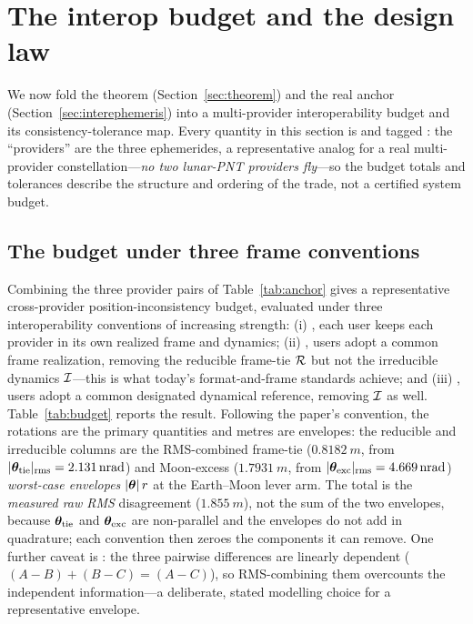 \section{The interop budget and the design law}
\label{sec:budget}

We now fold the theorem (Section~\ref{sec:theorem}) and the real anchor
(Section~\ref{sec:interephemeris}) into a multi-provider interoperability budget and
its consistency-tolerance map. Every quantity in this section is \Modelled{} and
tagged \modtag{}: the ``providers'' are the three ephemerides, a representative
analog for a real multi-provider constellation---\emph{no two lunar-PNT providers
fly}---so the budget totals and tolerances describe the structure and ordering of the
trade, not a certified system budget.

\subsection{The budget under three frame conventions}
\label{sec:budgetconventions}

Combining the three provider pairs of Table~\ref{tab:anchor} gives a
representative cross-provider position-inconsistency budget, evaluated under three
interoperability conventions of increasing strength: (i) , each
user keeps each provider in its own realized frame and dynamics; (ii)
, users adopt a common frame realization, removing the reducible
frame-tie $\mathcal{R}$ but not the irreducible dynamics $\mathcal{I}$---this is what today's
format-and-frame standards achieve; and (iii) , users adopt a
common designated dynamical reference, removing $\mathcal{I}$ as well. Table~\ref{tab:budget}
reports the result. Following the paper's convention, the rotations are the primary
quantities and metres are envelopes: the reducible and irreducible columns are the
RMS-combined frame-tie ($\SI{0.8182}{m}$, from
$|\bm{\theta}_{\mathrm{tie}}|_{\mathrm{rms}}=\SI{2.131}{nrad}$) and Moon-excess
($\SI{1.7931}{m}$, from $|\bm{\theta}_{\mathrm{exc}}|_{\mathrm{rms}}=\SI{4.669}{nrad}$)
\emph{worst-case envelopes} $|\bm{\theta}|\,r$ at the Earth--Moon lever arm. The
 total is the \emph{measured raw RMS} disagreement
($\SI{1.855}{m}$), not the sum of the two envelopes, because $\bm{\theta}_{\mathrm{tie}}$ and
$\bm{\theta}_{\mathrm{exc}}$ are non-parallel and the envelopes do not add in quadrature; each
convention then zeroes the components it can remove. One further caveat is \Modelled{}:
the three pairwise differences are linearly dependent
($(A{-}B)+(B{-}C)=(A{-}C)$), so RMS-combining them overcounts the independent
information---a deliberate, stated modelling choice for a representative envelope.

